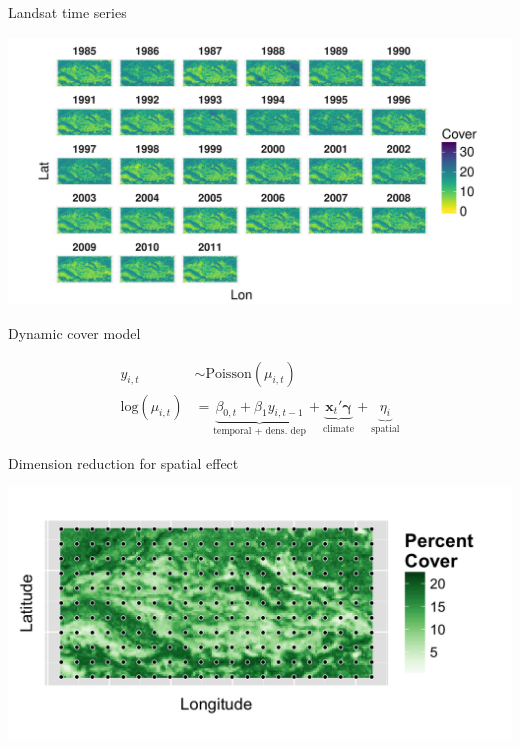 \documentclass[14pt, compress, aspectratio=1610]{beamer}
\begin{document}
\begin{frame}{%
\protect\hypertarget{landsat-time-series}{%
Landsat time series}}

\includegraphics[height=2.8in]{./figures/all_years_percCover.pdf}

\end{frame}

\begin{frame}{%
\protect\hypertarget{dynamic-cover-model}{%
Dynamic cover model}}

\begin{align*}
y_{i,t} &\sim \text{Poisson}(\mu_{i,t}) \\
\text{log}(\mu_{i,t}) &= \underbrace{\beta_{0,t} + \beta_{1}y_{i,t-1}}_\text{temporal + dens. dep} + \underbrace{\textbf{x}_{t}'\boldsymbol{\gamma}}_\text{climate} + \underbrace{\eta_{i}}_\text{spatial}
\end{align*}

\end{frame}

\begin{frame}{%
\protect\hypertarget{dimension-reduction-for-spatial-effect}{%
Dimension reduction for spatial effect}}

\includegraphics[width=\textwidth]{./figures/SAGE_Grid_wKnots_subset.png}

\end{frame}
\end{document}
